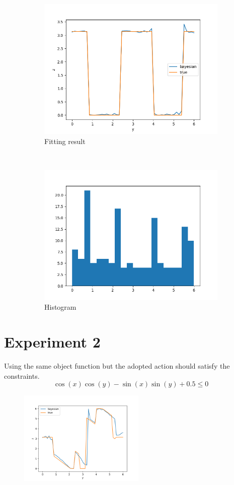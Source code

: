 \documentclass{article}
\begin{document}
\begin{figure}[!ht]
    \begin{subfigure}[b]{0.49\textwidth}
        \centering
        \includegraphics[width=\textwidth]{./cbo_1.png}
        \caption{Fitting result}
        \label{fig:rk_order_compare}
    \end{subfigure}~
    \begin{subfigure}[b]{0.49\textwidth}
      \centering
      \includegraphics[width=\textwidth]{./cbo_1_hist.png}
      \caption{Histogram}
      \label{fig:time_equal_verify}
    \end{subfigure}
    \caption{}
\end{figure}

\section{Experiment 2}
Using the same object function but the adopted action should
satisfy the constraints.
\begin{equation}
    \cos(x)  \cos(y) - \sin(x) \sin(y) + 0.5 \leq 0    
\end{equation}
\begin{figure}[!ht]
    \centering
    \includegraphics[width=6cm]{cbo_2.png}
\end{figure}
\end{document}
